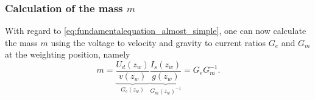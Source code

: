 \documentclass{report}
\numberwithin{tm}{section}
\begin{document}
%

\subsubsection{Calculation of the mass $m$}
With regard to \cref{eq:fundamentalequation_almost_simple}, one can now calculate the mass $m$ using the voltage to velocity and gravity to current ratios $G_e$ and $G_m$ at the weighting position, namely \begin{equation}\label{eq:massequation_G_factors}
m = \underbrace{\frac{U_d(z_w)}{v(z_w)}}_{G_e(z_w)}\underbrace{\frac{I_s(z_w)}{g(z_w)}}_{G_m(z_w)^{-1}} = G_e G_m^{-1}.
\end{equation}
\end{document}

